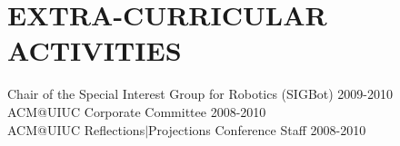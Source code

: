 	\section{EXTRA-CURRICULAR \\ ACTIVITIES}
	Chair of the Special Interest Group for Robotics (SIGBot) \hfill 2009-2010\\
	ACM@UIUC Corporate Committee \hfill 2008-2010\\
	ACM@UIUC Reflections$|$Projections Conference Staff \hfill 2008-2010

